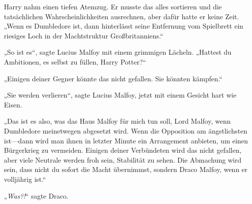 Harry nahm einen tiefen Atemzug. Er musste das alles sortieren und die tatsächlichen Wahrscheinlichkeiten ausrechnen, aber dafür hatte er keine Zeit.
„Wenn es Dumbledore ist, dann hinterlässt seine Entfernung vom Spielbrett ein riesiges Loch in der Machtstruktur Großbritanniens.“

„So ist es“, sagte Lucius Malfoy mit einem grimmigen Lächeln. „Hattest du Ambitionen, es selbst zu füllen, Harry Potter?“

„Einigen deiner Gegner könnte das nicht gefallen. Sie könnten kämpfen.“

„Sie werden verlieren“, sagte Lucius Malfoy, jetzt mit einem Gesicht hart wie Eisen.

„Das ist es also, was das Haus Malfoy für mich tun soll, Lord Malfoy, wenn Dumbledore meinetwegen abgesetzt wird. Wenn die Opposition am ängstlichsten ist—dann wird man ihnen in letzter Minute ein Arrangement anbieten, um einen Bürgerkrieg zu vermeiden. Einigen deiner Verbündeten wird das nicht gefallen, aber viele Neutrale werden froh sein, Stabilität zu sehen. Die Abmachung wird sein, dass nicht du sofort die Macht übernimmst, sondern Draco Malfoy, wenn er volljährig ist.“

„\emph{Was?!}“ sagte Draco.

